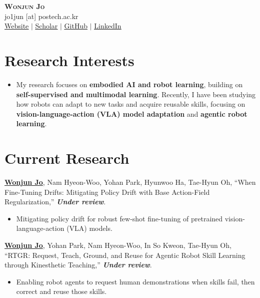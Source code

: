 \documentclass[letterpaper,11pt]{article}
\newcommand{\publicationSummary}[1]{\vspace{0.5mm}\begin{itemize}[leftmargin=0.34in, topsep=2pt, itemsep=0pt, parsep=0pt]\item \small{#1}\end{itemize}\vspace{0.5mm}}
\begin{document}
\begin{center}
    \textbf{\Huge \scshape Wonjun Jo} \\ \vspace{1mm}
    {\small
    jo1jun [at] postech.ac.kr \\
    \href{https://jo1jun.github.io/}{\underline{Website}} $|$
    \href{https://scholar.google.com/citations?user=-WfW-fUAAAAJ&hl=en}{\underline{Scholar}} $|$
    \href{https://github.com/jo1jun}{\underline{GitHub}} $|$
    \href{https://www.linkedin.com/in/wonjun-jo-a21582300/}{\underline{LinkedIn}}
    }
\end{center}

\section{Research Interests}
 \begin{itemize}[leftmargin=0.15in, label={}]
    \item{\small My research focuses on \textbf{embodied AI and robot learning}, building on \textbf{self-supervised and multimodal learning}. Recently, I have been studying how robots can adapt to new tasks and acquire reusable skills, focusing on \textbf{vision-language-action (VLA) model adaptation} and \textbf{agentic robot learning}.}
 \end{itemize}

\section{Current Research}

\noindent
{\textbf{\underline{Wonjun Jo}}, Nam Hyeon-Woo, Yohan Park, Hyunwoo Ha, Tae-Hyun Oh,
``When Fine-Tuning Drifts: Mitigating Policy Drift with Base Action-Field Regularization,''}
{\textbf{\textit{Under review}}}.
\publicationSummary{Mitigating policy drift for robust few-shot fine-tuning of pretrained vision-language-action (VLA) models.}
    \vspace{1mm}

\noindent
{\textbf{\underline{Wonjun Jo}}, Yohan Park, Nam Hyeon-Woo, In So Kweon, Tae-Hyun Oh,
``RTGR: Request, Teach, Ground, and Reuse for Agentic Robot Skill Learning through Kinesthetic Teaching,''}
{\textbf{\textit{Under review}}}.
\publicationSummary{Enabling robot agents to request human demonstrations when skills fail, then correct and reuse those skills.}
\end{document}
